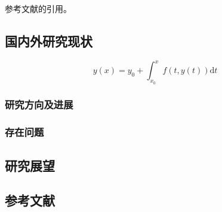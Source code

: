 参考文献的引用。

\subsection{国内外研究现状}
\begin{equation}
    y(x)=y_0+\int_{x_0}^xf(t,y(t))\text{d}t
\end{equation}
\subsubsection{研究方向及进展}
	
\subsubsection{存在问题}
	
\subsection{研究展望}


\subsection{参考文献}
{\normalfont{}\setlength{\baselineskip}{14pt}
\renewcommand{\refname}{\vspace{-\baselineskip}}
}